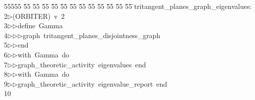 %
%
\begin{tabbing}
55555 \= 55 \= 55 \= 55 \= 55 \= 55 \= 55 \= 55 \= 55 \= 55 \= 55 \= 55 \= 55 \= \>tritangent\_planes\_graph\_eigenvalues:\\[0pt]
2\>$\triangleright$\>(ORBITER)\ v\ 2\ \\[0pt]
3\>$\triangleright$\>$\triangleright$\>define\ Gamma\ \\[0pt]
4\>$\triangleright$\>$\triangleright$\>$\triangleright$\>graph\ tritangent\_planes\_disjointness\_graph\ \\[0pt]
5\>$\triangleright$\>$\triangleright$\>end\ \\[0pt]
6\>$\triangleright$\>$\triangleright$\>with\ Gamma\ do\ \\[0pt]
7\>$\triangleright$\>$\triangleright$\>graph\_theoretic\_activity\ eigenvalues\ end\ \\[0pt]
8\>$\triangleright$\>$\triangleright$\>with\ Gamma\ do\ \\[0pt]
9\>$\triangleright$\>$\triangleright$\>graph\_theoretic\_activity\ eigenvalue\_report\ end\\[0pt]
10\>\end{tabbing}
